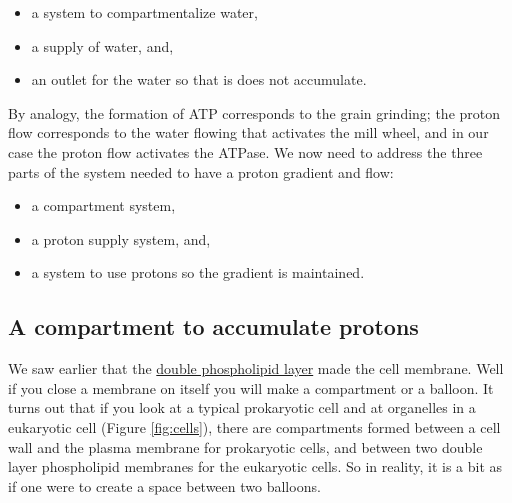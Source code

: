\documentclass[]{book}
\providecommand{\tightlist}{%
  \setlength{\itemsep}{0pt}\setlength{\parskip}{0pt}}
\theoremstyle{definition}
\theoremstyle{definition}
\theoremstyle{definition}
\theoremstyle{remark}
\begin{document}
\begin{itemize}
\tightlist
\item
  a system to compartmentalize water,
\item
  a supply of water, and,
\item
  an outlet for the water so that is does not accumulate.
\end{itemize}

By analogy, the formation of ATP corresponds to the grain grinding; the
proton flow corresponds to the water flowing that activates the mill
wheel, and in our case the proton flow activates the ATPase. We now need
to address the three parts of the system needed to have a proton
gradient and flow:

\begin{itemize}
\tightlist
\item
  a compartment system,
\item
  a proton supply system, and,
\item
  a system to use protons so the gradient is maintained.
\end{itemize}

\subsection{A compartment to accumulate
protons}\label{a-compartment-to-accumulate-protons}

We saw earlier that the \protect\hyperlink{phospholipids}{double
phospholipid layer} made the cell membrane. Well if you close a membrane
on itself you will make a compartment or a balloon. It turns out that if
you look at a typical prokaryotic cell and at organelles in a eukaryotic
cell (Figure \ref{fig:cells}), there are compartments formed between a
cell wall and the plasma membrane for prokaryotic cells, and between two
double layer phospholipid membranes for the eukaryotic cells. So in
reality, it is a bit as if one were to create a space between two
balloons.
\end{document}
